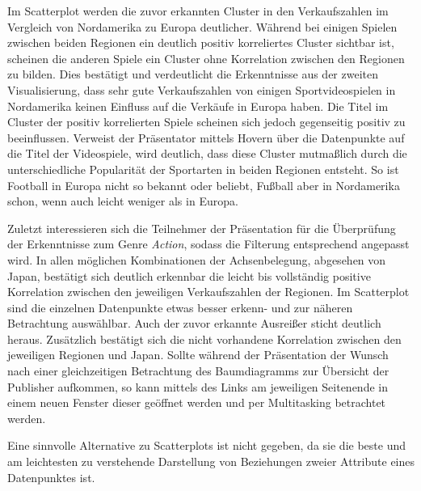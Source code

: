 \documentclass[usegeometry=true]{scrartcl}
\begin{document}
Im Scatterplot werden die zuvor erkannten Cluster in den Verkaufszahlen im Vergleich von Nordamerika zu Europa deutlicher. 
Während bei einigen Spielen zwischen beiden Regionen ein deutlich positiv korreliertes Cluster sichtbar ist, scheinen die anderen Spiele ein Cluster ohne Korrelation zwischen den Regionen zu bilden.
Dies bestätigt und verdeutlicht die Erkenntnisse aus der zweiten Visualisierung, dass sehr gute Verkaufszahlen von einigen Sportvideospielen in Nordamerika keinen Einfluss auf die Verkäufe in Europa haben. 
Die Titel im Cluster der positiv korrelierten Spiele scheinen sich jedoch gegenseitig positiv zu beeinflussen. 
Verweist der Präsentator mittels Hovern über die Datenpunkte auf die Titel der Videospiele, wird deutlich, dass diese Cluster mutmaßlich durch die unterschiedliche Popularität der Sportarten in beiden Regionen entsteht. 
So ist Football in Europa nicht so bekannt oder beliebt, Fußball aber in Nordamerika schon, wenn auch leicht weniger als in Europa.

Zuletzt interessieren sich die Teilnehmer der Präsentation für die Überprüfung der Erkenntnisse zum Genre \textit{Action}, sodass die Filterung entsprechend angepasst wird. 
In allen möglichen Kombinationen der Achsenbelegung, abgesehen von Japan, bestätigt sich deutlich erkennbar die leicht bis vollständig positive Korrelation zwischen den jeweiligen Verkaufszahlen der Regionen.
Im Scatterplot sind die einzelnen Datenpunkte etwas besser erkenn- und zur näheren Betrachtung auswählbar. 
Auch der zuvor erkannte Ausreißer sticht deutlich heraus. 
Zusätzlich bestätigt sich die nicht vorhandene Korrelation zwischen den jeweiligen Regionen und Japan.
Sollte während der Präsentation der Wunsch nach einer gleichzeitigen Betrachtung des Baumdiagramms zur Übersicht der Publisher aufkommen, so kann mittels des Links am jeweiligen Seitenende in einem neuen Fenster dieser geöffnet werden und per Multitasking betrachtet werden.

Eine sinnvolle Alternative zu Scatterplots ist nicht gegeben, da sie die beste und am leichtesten zu verstehende Darstellung von Beziehungen zweier Attribute eines Datenpunktes ist. 
\end{document}
